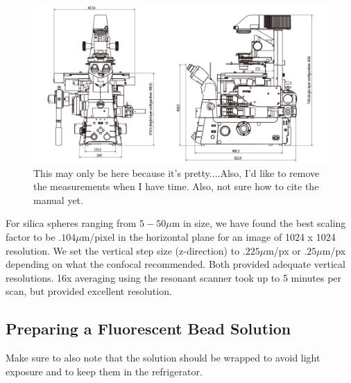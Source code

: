 \begin{figure}
	\centering
	\includegraphics[width=0.7\linewidth]{confocal_stuff/Ti2_diagram_1}
	\caption[Nikon Ti2 Microscope Base]{This may only be here because it's pretty....Also, I'd like to remove the measurements when I have time. Also, not sure how to cite the manual yet.}
	\label{fig:ti2diagram1}
\end{figure}

For silica spheres ranging from $5-50 \mu$m in size, we have found the best scaling factor to be $.104 \mu$m/pixel in the horizontal plane for an image of 1024 x 1024 resolution. We set the vertical step size (z-direction) to $.225 \mu$m/px or $.25 \mu$m/px depending on what the confocal recommended. Both provided adequate vertical resolutions. 16x averaging using the resonant scanner took up to 5 minutes per scan, but provided excellent resolution. 


\subsection{Preparing a Fluorescent Bead Solution}
Make sure to also note that the solution should be wrapped to avoid light exposure and to keep them in the refrigerator. 

